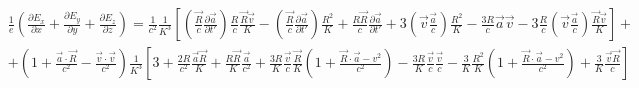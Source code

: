 \documentclass[11pt]{article}
\begin{document}
\[\begin{align}
  & \frac{1}{e}\left( \frac{\partial {{E}_{x}}}{\partial x}+\frac{\partial {{E}_{y}}}{\partial y}+\frac{\partial {{E}_{z}}}{\partial z} \right)=\frac{1}{{{c}^{2}}}\frac{1}{{{K}^{3}}}\left[ \left( \frac{\overrightarrow{R}}{c}\frac{\partial \overrightarrow{a}}{\partial t'} \right)\frac{R}{c}\frac{\overrightarrow{R}\overrightarrow{v}}{K}-\left( \frac{\overrightarrow{R}}{c}\frac{\partial \overrightarrow{a}}{\partial t'} \right)\frac{{{R}^{2}}}{K}+\frac{R\overrightarrow{R}}{c}\frac{\partial \overrightarrow{a}}{\partial t'}+3\left( \overrightarrow{v}\frac{\overrightarrow{a}}{c} \right)\frac{{{R}^{2}}}{K}-\frac{3R}{c}\overrightarrow{a}\overrightarrow{v}-3\frac{R}{c}\left( \overrightarrow{v}\frac{\overrightarrow{a}}{c} \right)\frac{\overrightarrow{R}\overrightarrow{v}}{K} \right]+ \\ 
 & +\left( 1+\frac{\overrightarrow{a}\cdot \overrightarrow{R}}{{{c}^{2}}}-\frac{\overrightarrow{v}\cdot \overrightarrow{v}}{{{c}^{2}}} \right)\frac{1}{{{K}^{3}}}\left[ 3+\frac{2R}{{{c}^{2}}}\frac{\overrightarrow{a}\overrightarrow{R}}{K}+\frac{R\overrightarrow{R}}{K}\frac{\overrightarrow{a}}{{{c}^{2}}}+\frac{3R}{K}\frac{\overrightarrow{v}}{c}\frac{\overrightarrow{R}}{K}\left( 1+\frac{\overrightarrow{R}\cdot \overrightarrow{a}-{{v}^{2}}}{{{c}^{2}}} \right)-\frac{3R}{K}\frac{\overrightarrow{v}}{c}\frac{\overrightarrow{v}}{c}-\frac{3}{K}\frac{{{R}^{2}}}{K}\left( 1+\frac{\overrightarrow{R}\cdot \overrightarrow{a}-{{v}^{2}}}{{{c}^{2}}} \right)+\frac{3}{K}\frac{\overrightarrow{v}\overrightarrow{R}}{c} \right] \\ 
 &  \\ 
\end{align}\]
\end{document}
